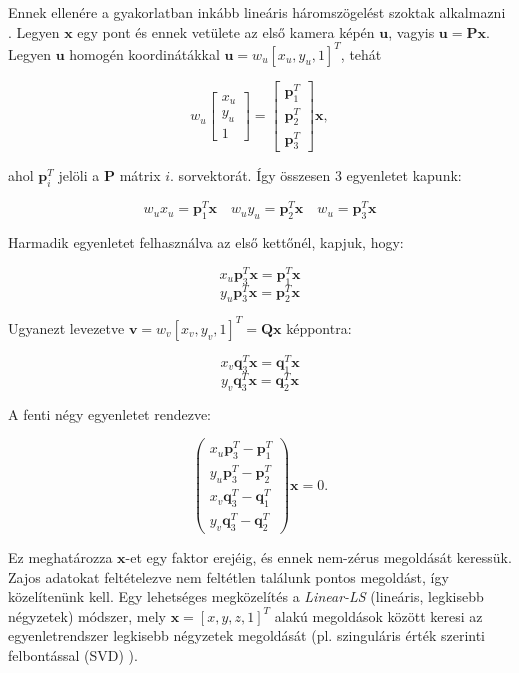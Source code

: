 Ennek ellenére a gyakorlatban inkább lineáris háromszögelést szoktak alkalmazni \cite[5.1 szekció]{hartley-triangulation}. Legyen $\mathbf{x}$ egy pont és ennek vetülete az első kamera képén $\mathbf{u}$, vagyis $\mathbf{u} = \mathbf{P}\mathbf{x}$. Legyen $\mathbf{u}$ homogén koordinátákkal $\mathbf{u} = w_u[x_u, y_u, 1]^T$, tehát

\[w_u\left[ \begin{array}{c} x_u \\ y_u \\ 1 \end{array} \right] = \left[ \begin{array}{c} \mathbf{p}_1^T \\ \mathbf{p}_2^T \\ \mathbf{p}_3^T \end{array} \right] \mathbf{x},\]

ahol $\mathbf{p}_i^T$ jelöli a $\mathbf{P}$ mátrix $i$. sorvektorát. Így összesen 3 egyenletet kapunk:

\[w_ux_u = \mathbf{p}_1^T\mathbf{x} \quad w_uy_u = \mathbf{p}_2^T\mathbf{x} \quad w_u = \mathbf{p}_3^T\mathbf{x}\]

Harmadik egyenletet felhasználva az első kettőnél, kapjuk, hogy:

\[x_u\mathbf{p}_3^T\mathbf{x} = \mathbf{p}_1^T\mathbf{x}\]
\[y_u\mathbf{p}_3^T\mathbf{x} = \mathbf{p}_2^T\mathbf{x}\]

Ugyanezt levezetve $\mathbf{v} = w_v[x_v, y_v, 1]^T = \mathbf{Q}\mathbf{x}$ képpontra:

\[x_v\mathbf{q}_3^T\mathbf{x} = \mathbf{q}_1^T\mathbf{x}\]
\[y_v\mathbf{q}_3^T\mathbf{x} = \mathbf{q}_2^T\mathbf{x}\]

A fenti négy egyenletet rendezve:

\[\left( \begin{array}{c} x_u\mathbf{p}_3^T - \mathbf{p}_1^T \\ y_u\mathbf{p}_3^T - \mathbf{p}_2^T \\ x_v\mathbf{q}_3^T - \mathbf{q}_1^T \\ y_v\mathbf{q}_3^T - \mathbf{q}_2^T \end{array} \right) \mathbf{x} = 0.\]

Ez meghatározza $\mathbf{x}$-et egy faktor erejéig, és ennek nem-zérus megoldását keressük. Zajos adatokat feltételezve nem feltétlen találunk pontos megoldást, így közelítenünk kell. Egy lehetséges megközelítés a \textit{Linear-LS} (lineáris, legkisebb négyzetek) módszer, mely $\mathbf{x} = [x, y, z, 1]^T$ alakú megoldások között keresi az egyenletrendszer legkisebb négyzetek megoldását (pl. szinguláris érték szerinti felbontással (SVD) \cite{cs-svd}). 

